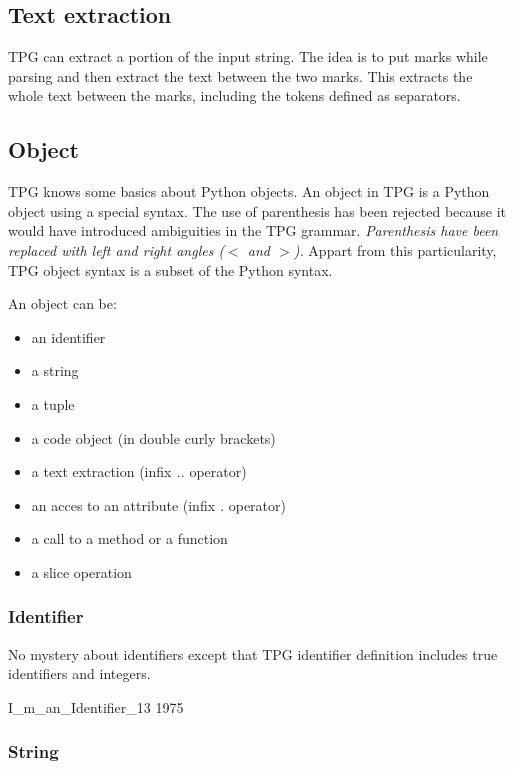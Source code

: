 \subsection{Text extraction}
\label{parser:mark}

TPG can extract a portion of the input string.
The idea is to put marks while parsing and then extract the text between the two marks.
This extracts the whole text between the marks, including the tokens defined as separators.

\subsection{Object}
\label{parser:object}

TPG knows some basics about Python objects.
An object in TPG is a Python object using a special syntax.
The use of parenthesis has been rejected because it would have introduced ambiguities in the TPG grammar.
\emph{Parenthesis have been replaced with left and right angles (\emph{$<$} and \emph{$>$}).}
Appart from this particularity, TPG object syntax is a subset of the Python syntax.

An object can be:
\begin{itemize}
	\item an identifier
	\item a string
	\item a tuple
	\item a code object (in double curly brackets)
	\item a text extraction (infix \emph{..} operator)
	\item an acces to an attribute (infix \emph{.} operator)
	\item a call to a method or a function
	\item a slice operation
\end{itemize}

\subsubsection{Identifier}

No mystery about identifiers except that TPG identifier definition includes true identifiers and integers.

\begin{verbatimtab}[4]
	I_m_an_Identifier_13
	1975
\end{verbatimtab}

\subsubsection{String}

